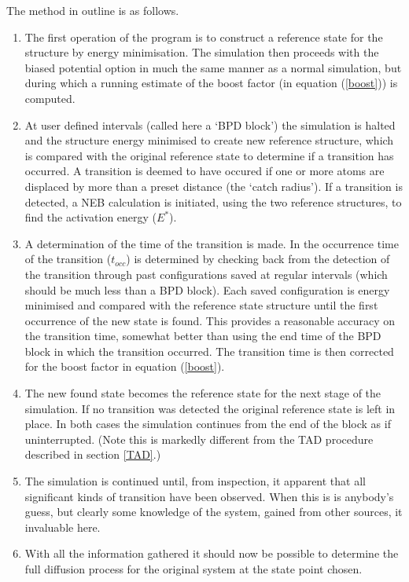 The method in outline is as follows. 
\begin{enumerate}
\item The first operation of the program is to construct a reference 
state for the structure by energy minimisation.
The simulation then proceeds with the biased potential option in much
the same manner as a normal simulation, but during which a running
estimate of the boost factor (in equation (\ref{boost})) is computed. 
\item At user defined intervals (called here a `BPD block') the 
simulation is halted and the structure energy minimised to create new
reference structure, which is compared with the original reference
state to determine if a transition has occurred. A transition is
deemed to have occured if one or more atoms are displaced by more than
a preset distance (the `catch radius').  If a transition is
detected, a NEB calculation is initiated, using the two reference
structures, to find the activation energy ($E^{*}$). 
\item A determination of the time of the transition is made.
In \D{} the occurrence time of the transition ($t_{occ}$) is determined
by checking back from the detection of the transition through past
configurations saved at regular intervals (which should be much less
than a BPD block).  Each saved configuration is energy minimised and
compared with the reference state structure until the first occurrence
of the new state is found. This provides a reasonable accuracy on the
transition time, somewhat better than using the end time of the BPD
block in which the transition occurred. The transition time is
then corrected for the boost factor in equation (\ref{boost}).
\item The new found state becomes the reference state for the next stage of
the simulation. If no transition was detected the original reference state is
left in place.  In both cases the simulation continues
from the end of the block as if uninterrupted. (Note this 
is markedly different from the TAD procedure
described in section \ref{TAD}.)
\item The simulation is continued until, from inspection, it apparent 
that all significant kinds of transition have been observed. When this
is is anybody's guess, but clearly some knowledge of the system,
gained from other sources, it invaluable here.
\item With all the information gathered it should now be possible to 
determine the full diffusion process for the original system at the
state point chosen.
\end{enumerate}

